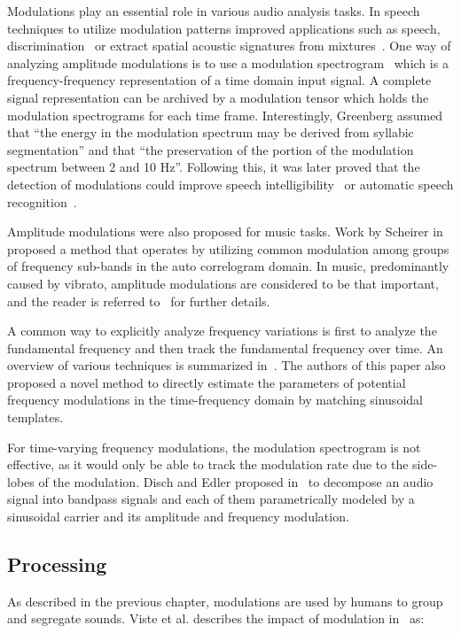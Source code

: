 Modulations play an essential role in various audio analysis tasks.
In speech techniques to utilize modulation patterns improved applications such as speech, discrimination~\cite{mesgarani04} or extract spatial acoustic signatures from mixtures~\cite{sukittanon06}.
One way of analyzing amplitude modulations is to use a modulation spectrogram~\cite{greenberg97} which is a frequency-frequency representation of a time domain input signal.
A complete signal representation can be archived by a modulation tensor which holds the modulation spectrograms for each time frame.
Interestingly, Greenberg assumed that ``the energy in the modulation spectrum may be derived from syllabic segmentation'' and that ``the preservation of the portion of the modulation spectrum between 2 and 10 Hz''.
Following this, it was later proved that the detection of modulations could improve speech intelligibility~\cite{elhilali03} or automatic speech recognition~\cite{kingsbury98}.
\par
Amplitude modulations were also proposed for music tasks. 
Work by Scheirer in~\cite{scheirer99} proposed a method that operates by utilizing common modulation among groups of frequency sub-bands in the auto correlogram domain.
In music, predominantly caused by vibrato, amplitude modulations are considered to be that important, and the reader is referred to~\cite{muller11} for further details.
\par
A common way to explicitly analyze frequency variations is first to analyze the fundamental frequency and then track the fundamental frequency over time. 
An overview of various techniques is summarized in~\cite{driedger16}.
The authors of this paper also proposed a novel method to directly estimate the parameters of potential frequency modulations in the time-frequency domain by matching sinusoidal templates.
\par
For time-varying frequency modulations, the modulation spectrogram is not effective, as it would only be able to track the modulation rate due to the side-lobes of the modulation.
Disch and Edler proposed in~\cite{disch09} to decompose an audio signal into bandpass signals and each of them parametrically modeled by a sinusoidal carrier and its amplitude and frequency modulation.

\subsection{Processing}

As described in the previous chapter, modulations are used by humans to group and segregate sounds. Viste et al. describes the impact of modulation in~\cite{viste03} as:

